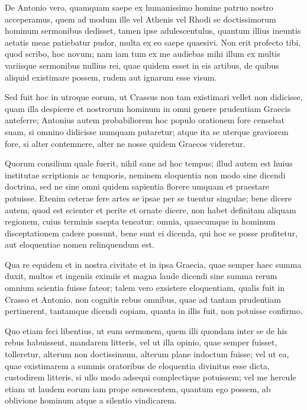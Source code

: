  De Antonio vero, quamquam saepe ex humanissimo homine patruo nostro acceperamus, quem ad modum ille vel Athenis vel Rhodi se doctissimorum hominum sermonibus dedisset, tamen ipse adulescentulus, quantum illius ineuntis aetatis meae patiebatur pudor, multa ex eo saepe quaesivi. Non erit profecto tibi, quod scribo, hoc novum; nam iam tum ex me audiebas mihi illum ex multis variisque sermonibus nullius rei, quae quidem esset in eis artibus, de quibus aliquid existimare possem, rudem aut ignarum esse visum.

 Sed fuit hoc in utroque eorum, ut Crassus non tam existimari vellet non didicisse, quam illa despicere et nostrorum hominum in omni genere prudentiam Graecis anteferre; Antonius autem probabiliorem hoc populo orationem fore censebat suam, si omnino didicisse numquam putaretur; atque ita se uterque graviorem fore, si alter contemnere, alter ne nosse quidem Graecos videretur.

 Quorum consilium quale fuerit, nihil sane ad hoc tempus; illud autem est huius institutae scriptionis ac temporis, neminem eloquentia non modo sine dicendi doctrina, sed ne sine omni quidem sapientia florere umquam et praestare potuisse. Etenim ceterae fere artes se ipsae per se tuentur singulae; bene dicere autem, quod est scienter et perite et ornate dicere, non habet definitam aliquam regionem, cuius terminis saepta teneatur: omnia, quaecumque in hominum disceptationem cadere possunt, bene sunt ei dicenda, qui hoc se posse profitetur, aut eloquentiae nomen relinquendum est.

 Qua re equidem et in nostra civitate et in ipsa Graecia, quae semper haec summa duxit, multos et ingeniis eximiis et magna laude dicendi sine summa rerum omnium scientia fuisse fateor; talem vero exsistere eloquentiam, qualis fuit in Crasso et Antonio, non cognitis rebus omnibus, quae ad tantam prudentiam pertinerent, tantamque dicendi copiam, quanta in illis fuit, non potuisse confirmo.

 Quo etiam feci libentius, ut eum sermonem, quem illi quondam inter se de his rebus habuissent, mandarem litteris, vel ut illa opinio, quae semper fuisset, tolleretur, alterum non doctissimum, alterum plane indoctum fuisse; vel ut ea, quae existimarem a summis oratoribus de eloquentia divinitus esse dicta, custodirem litteris, si ullo modo adsequi complectique potuissem; vel me hercule etiam ut laudem eorum iam prope senescentem, quantum ego possem, ab oblivione hominum atque a silentio vindicarem.

